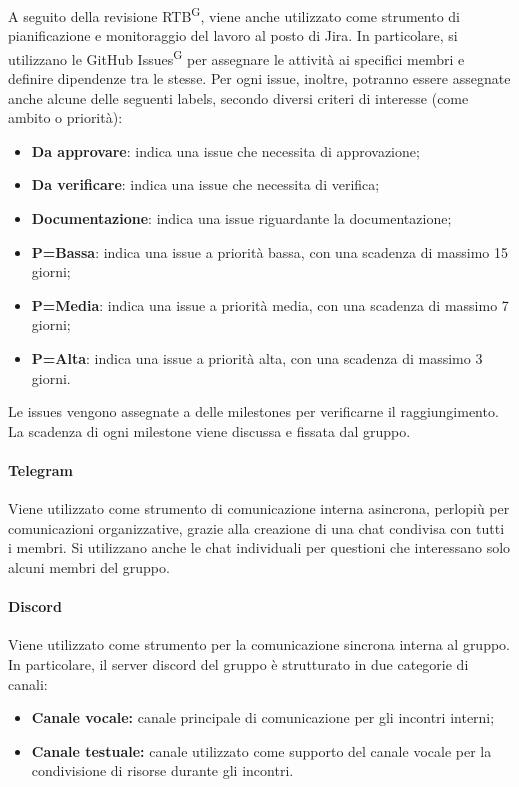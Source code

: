A seguito della revisione RTB\textsuperscript{G}, viene anche utilizzato come strumento di pianificazione e monitoraggio del lavoro al posto di Jira. In particolare, si utilizzano le GitHub Issues\textsuperscript{G} per assegnare le attività ai specifici membri e definire dipendenze tra le stesse. Per ogni issue, inoltre, potranno essere assegnate anche alcune delle seguenti labels, secondo diversi criteri di interesse (come ambito o priorità):
\begin{itemize}
    \item \textbf{Da approvare}: indica una issue che necessita di approvazione;
    \item \textbf{Da verificare}: indica una issue che necessita di verifica;
    \item \textbf{Documentazione}: indica una issue riguardante la documentazione;
    \item \textbf{P=Bassa}: indica una issue a priorità bassa, con una scadenza di massimo 15 giorni;
    \item \textbf{P=Media}: indica una issue a priorità media, con una scadenza di massimo 7 giorni;
    \item \textbf{P=Alta}: indica una issue a priorità alta, con una scadenza di massimo 3 giorni.
\end{itemize}
Le issues vengono assegnate a delle milestones per verificarne il raggiungimento. La scadenza di ogni milestone viene discussa e fissata dal gruppo. 

\paragraph{Telegram}
Viene utilizzato come strumento di comunicazione interna asincrona, perlopiù per comunicazioni organizzative, grazie alla creazione di una chat condivisa con tutti i membri. Si utilizzano anche le chat individuali per questioni che interessano solo alcuni membri del gruppo.

\paragraph{Discord}
Viene utilizzato come strumento per la comunicazione sincrona interna al gruppo. In particolare, il server discord del gruppo è strutturato in due categorie di canali:
\begin{itemize}
    \item \textbf{Canale vocale:} canale principale di comunicazione per gli incontri interni;
    \item \textbf{Canale testuale:} canale utilizzato come supporto del canale vocale per la condivisione di risorse durante gli incontri.
\end{itemize}

